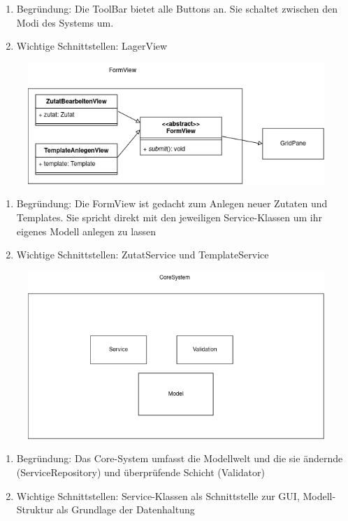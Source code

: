 \begin{enumerate}
    \item Begründung: Die ToolBar bietet alle Buttons an. Sie schaltet zwischen den Modi des Systems um.
    \item Wichtige Schnittstellen: LagerView
\end{enumerate}
\begin{figure}[H]
    \includegraphics[width=\linewidth]{images/bausteinsicht/Ebene4_FormView.png}
    \label{fig:FormView}
\end{figure}
\begin{enumerate}
    \item Begründung: Die FormView ist gedacht zum Anlegen neuer Zutaten und Templates. Sie spricht direkt mit den jeweiligen Service-Klassen um ihr eigenes Modell anlegen zu lassen
    \item Wichtige Schnittstellen: ZutatService und TemplateService
\end{enumerate}
\begin{figure}[H]
    \includegraphics[width=\linewidth]{images/bausteinsicht/Ebene2_Core.png}
    \label{fig:Core}
\end{figure}
\begin{enumerate}
    \item Begründung: Das Core-System umfasst die Modellwelt und die sie ändernde (ServiceRepository) und überprüfende Schicht (Validator)
    \item Wichtige Schnittstellen: Service-Klassen als Schnittstelle zur GUI, Modell-Struktur als Grundlage der Datenhaltung
\end{enumerate}
